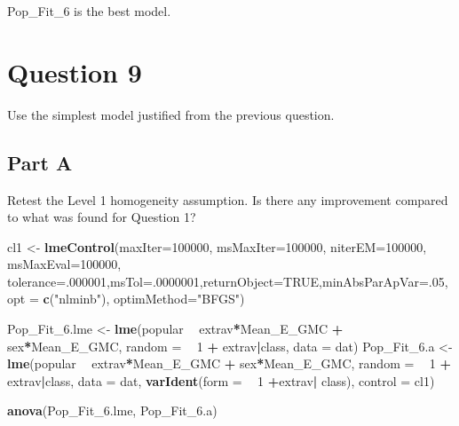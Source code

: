 \documentclass[]{article}
\newenvironment{Shaded}{\begin{snugshade}}{\end{snugshade}}
\newcommand{\KeywordTok}[1]{\textcolor[rgb]{0.13,0.29,0.53}{\textbf{#1}}}
\newcommand{\DataTypeTok}[1]{\textcolor[rgb]{0.13,0.29,0.53}{#1}}
\newcommand{\DecValTok}[1]{\textcolor[rgb]{0.00,0.00,0.81}{#1}}
\newcommand{\FloatTok}[1]{\textcolor[rgb]{0.00,0.00,0.81}{#1}}
\newcommand{\StringTok}[1]{\textcolor[rgb]{0.31,0.60,0.02}{#1}}
\newcommand{\OtherTok}[1]{\textcolor[rgb]{0.56,0.35,0.01}{#1}}
\newcommand{\OperatorTok}[1]{\textcolor[rgb]{0.81,0.36,0.00}{\textbf{#1}}}
\newcommand{\NormalTok}[1]{#1}
\begin{document}
Pop\_Fit\_6 is the best model.

\section{Question 9}\label{question-9}

Use the simplest model justified from the previous question.

\subsection{Part A}\label{part-a-4}

Retest the Level 1 homogeneity assumption. Is there any improvement
compared to what was found for Question 1?

\begin{Shaded}
\begin{Highlighting}[]
\NormalTok{cl1 <-}\StringTok{ }\KeywordTok{lmeControl}\NormalTok{(}\DataTypeTok{maxIter=}\DecValTok{100000}\NormalTok{, }\DataTypeTok{msMaxIter=}\DecValTok{100000}\NormalTok{, }\DataTypeTok{niterEM=}\DecValTok{100000}\NormalTok{, }\DataTypeTok{msMaxEval=}\DecValTok{100000}\NormalTok{,}
                  \DataTypeTok{tolerance=}\NormalTok{.}\DecValTok{000001}\NormalTok{,}\DataTypeTok{msTol=}\NormalTok{.}\DecValTok{0000001}\NormalTok{,}\DataTypeTok{returnObject=}\OtherTok{TRUE}\NormalTok{,}\DataTypeTok{minAbsParApVar=}\NormalTok{.}\DecValTok{05}\NormalTok{,}
                  \DataTypeTok{opt =} \KeywordTok{c}\NormalTok{(}\StringTok{"nlminb"}\NormalTok{), }\DataTypeTok{optimMethod=}\StringTok{"BFGS"}\NormalTok{)}

\NormalTok{Pop_Fit_}\FloatTok{6.}\NormalTok{lme <-}\StringTok{ }\KeywordTok{lme}\NormalTok{(popular }\OperatorTok{~}\StringTok{ }\NormalTok{extrav}\OperatorTok{*}\NormalTok{Mean_E_GMC }\OperatorTok{+}\StringTok{ }\NormalTok{sex}\OperatorTok{*}\NormalTok{Mean_E_GMC, }\DataTypeTok{random =} \OperatorTok{~}\StringTok{ }\DecValTok{1} \OperatorTok{+}\StringTok{ }\NormalTok{extrav}\OperatorTok{|}\NormalTok{class, }\DataTypeTok{data =}\NormalTok{ dat)}
\NormalTok{Pop_Fit_}\FloatTok{6.}\NormalTok{a <-}\StringTok{ }\KeywordTok{lme}\NormalTok{(popular }\OperatorTok{~}\StringTok{ }\NormalTok{extrav}\OperatorTok{*}\NormalTok{Mean_E_GMC }\OperatorTok{+}\StringTok{ }\NormalTok{sex}\OperatorTok{*}\NormalTok{Mean_E_GMC, }\DataTypeTok{random =} \OperatorTok{~}\StringTok{ }\DecValTok{1} \OperatorTok{+}\StringTok{ }\NormalTok{extrav}\OperatorTok{|}\NormalTok{class, }
                   \DataTypeTok{data =}\NormalTok{ dat, }\KeywordTok{varIdent}\NormalTok{(}\DataTypeTok{form =} \OperatorTok{~}\StringTok{ }\DecValTok{1} \OperatorTok{+}\NormalTok{extrav}\OperatorTok{|}\StringTok{ }\NormalTok{class), }\DataTypeTok{control =}\NormalTok{ cl1)}

\KeywordTok{anova}\NormalTok{(Pop_Fit_}\FloatTok{6.}\NormalTok{lme, Pop_Fit_}\FloatTok{6.}\NormalTok{a)}
\end{Highlighting}
\end{Shaded}
\end{document}
